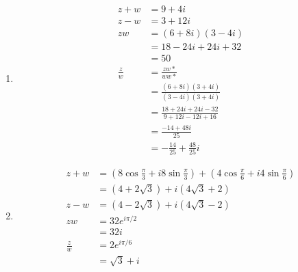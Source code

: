 \documentclass{article}
\begin{document}
\begin{enumerate}
  \item

        \begin{align*}
          z + w       & = 9 + 4 i                                            \\
          z - w       & = 3 + 12 i                                           \\
          z w         & = (6 + 8 i) (3 - 4 i)                                \\
                      & = 18 - 24 i + 24 i + 32                              \\
                      & = 50                                                 \\
          \frac{z}{w} & = \frac{z w*}{w w*}                                  \\
                      & = \frac{(6 + 8 i) (3 + 4 i)}{(3 - 4 i) (3 + 4 i)}    \\
                      & = \frac{18 + 24 i + 24 i - 32}{9 + 12 i - 12 i + 16} \\
                      & = \frac{-14 + 48 i}{25}                              \\
                      & = -\frac{14}{25} + \frac{48}{25} i
        \end{align*}

  \item

        \begin{align*}
          z + w       & = \left( 8 \cos \frac{\pi}{3} + i 8 \sin \frac{\pi}{3} \right) + \left( 4 \cos \frac{\pi}{6} + i 4 \sin \frac{\pi}{6} \right) \\
                      & = (4 + 2 \sqrt{3}) + i (4 \sqrt{3} + 2)                                                                                       \\
          z - w       & = (4 - 2 \sqrt{3}) + i (4 \sqrt{3} - 2)                                                                                       \\
          z w         & = 32 e^{i \pi / 2}                                                                                                            \\
                      & = 32 i                                                                                                                        \\
          \frac{z}{w} & = 2 e^{i \pi / 6}                                                                                                             \\
                      & = \sqrt{3} + i
        \end{align*}
\end{enumerate}
\end{document}
